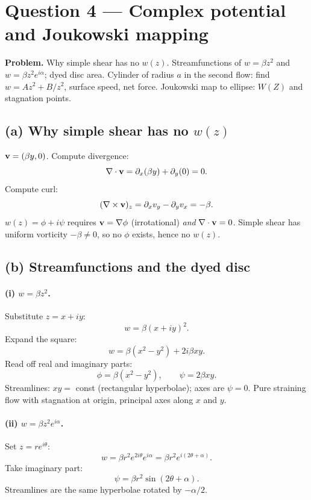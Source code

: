 \documentclass[11pt]{article}
\begin{document}
\section*{Question 4 --- Complex potential and Joukowski mapping}

\textbf{Problem.} Why simple shear has no $w(z)$. Streamfunctions of $w=\beta z^{2}$ and $w=\beta z^{2}e^{i\alpha}$; dyed disc area. Cylinder of radius $a$ in the second flow: find $w=Az^{2}+B/z^{2}$, surface speed, net force. Joukowski map to ellipse: $W(Z)$ and stagnation points.

\subsection*{(a) Why simple shear has no $w(z)$}

$\vb v=(\beta y,0)$. Compute divergence:
\[ \nabla\cdot\vb v = \partial_x(\beta y)+\partial_y(0) = 0. \]
Compute curl:
\[ (\nabla\times\vb v)_z = \partial_x v_y - \partial_y v_x = -\beta. \]
$w(z)=\phi+i\psi$ requires $\vb v=\nabla\phi$ (irrotational) \emph{and} $\nabla\cdot\vb v=0$. Simple shear has uniform vorticity $-\beta\ne 0$, so no $\phi$ exists, hence no $w(z)$.

\subsection*{(b) Streamfunctions and the dyed disc}

\paragraph{(i) $w=\beta z^{2}$.} Substitute $z=x+iy$:
\[ w = \beta(x+iy)^{2}. \]
Expand the square:
\[ w = \beta(x^{2}-y^{2}) + 2i\beta xy. \]
Read off real and imaginary parts:
\[ \boxed{\;\phi=\beta(x^{2}-y^{2}),\qquad \psi=2\beta xy.\;} \]
Streamlines: $xy=$ const (rectangular hyperbolae); axes are $\psi=0$. Pure straining flow with stagnation at origin, principal axes along $x$ and $y$.

\paragraph{(ii) $w=\beta z^{2}e^{i\alpha}$.} Set $z=re^{i\theta}$:
\[ w = \beta r^{2}e^{2i\theta}e^{i\alpha} = \beta r^{2}e^{i(2\theta+\alpha)}. \]
Take imaginary part:
\[ \boxed{\;\psi = \beta r^{2}\sin(2\theta+\alpha).\;} \]
Streamlines are the same hyperbolae rotated by $-\alpha/2$.
\end{document}
